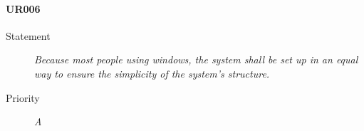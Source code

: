 \paragraph{UR006}
  \begin{description}
  \item [Statement] 
    \textit{ Because most people using windows,
			the system shall be set up in an equal way to ensure the simplicity of the system's structure.}
  \item [Priority] \textit{A}
\end{description}